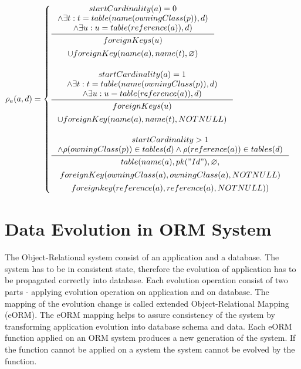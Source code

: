 \documentclass[11pt]{article}
\begin{document}
$
\rho_a(a,d) = \begin{cases}
 \inference{startCardinality(a) = 0 \\ \wedge \exists t : t = table(name(owningClass(p)), d) \\ \wedge \exists u : u = table(reference(a)), d)}{
 \begin{gathered}
 foreignKeys(u) \\ \cup foreignKey(name(a), name(t),  \varnothing) 
 \end{gathered}
 }
  \\ \\
 \inference{startCardinality(a) = 1 \\\\ \wedge \exists t : t = table(name(owningClass(p)), d) \\ \wedge \exists u : u = table(reference(a)), d)}{\begin{gathered}
foreignKeys(u) \\ \cup  foreignKey(name(a), name(t),  NOTNULL)
\end{gathered}
} \\ \\
 
  \inference{startCardinality > 1 \\ \wedge \rho(owningClass(p)) \in tables(d) \wedge \rho(reference(a)) \in tables(d)}{
  \begin{gathered}
 table(name(a), pk("Id"), \varnothing, \\ foreignKey(owningClass(a),owningClass(a), NOTNULL) \\ foreignkey(reference(a), reference(a), NOTNULL)) 
  \end{gathered}}

  
 \end{cases}
$


\section{Data Evolution in ORM System}
The Object-Relational system consist of an application and a database. The system has to be in consistent state, therefore the evolution of application has to be propagated correctly into database. Each evolution operation consist of two parts - applying evolution operation on application and on database. The mapping of the evolution change is called extended Object-Relational Mapping (eORM). The eORM mapping helps to assure consistency of the system by transforming application evolution into database schema and data. Each eORM function applied on an ORM system produces a new generation of the system. If the function cannot be applied on a system the system cannot be evolved by the function. 
\end{document}
